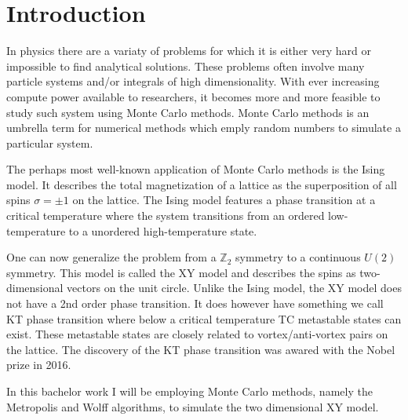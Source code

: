 \chapter{Introduction}\label{chap:introduction}
	In physics there are a variaty of problems for which it is either very hard or impossible to find analytical solutions. These problems often involve many particle systems and/or integrals of high dimensionality. With ever increasing compute power available to researchers, it becomes more and more feasible to study such system using Monte Carlo methods. Monte Carlo methods is an umbrella term for numerical methods which emply random numbers to simulate a particular system.
	
	The perhaps most well-known application of Monte Carlo methods is the Ising model.  It describes the total magnetization of a lattice as the superposition of
	all spins $\sigma = \pm 1$ on the lattice. The Ising model features a phase transition at a critical temperature where the system transitions from an ordered low-temperature to a unordered high-temperature state.
	
	One can now generalize the problem from a $\mathbb{Z}_2$ symmetry to a continuous $U(2)$ symmetry. This model is called the XY model and describes the spins as two-dimensional vectors on the unit circle. Unlike the Ising model, the XY model does not have a 2nd order phase transition. It does however have something we call KT phase transition where below a critical temperature TC metastable states can exist. These metastable states are closely related to vortex/anti-vortex pairs on the lattice. The discovery of the KT phase transition was awared with the Nobel prize in 2016.
	
	In this bachelor work I will be employing Monte Carlo methods, namely the Metropolis and Wolff algorithms, to simulate the two dimensional XY model. 
